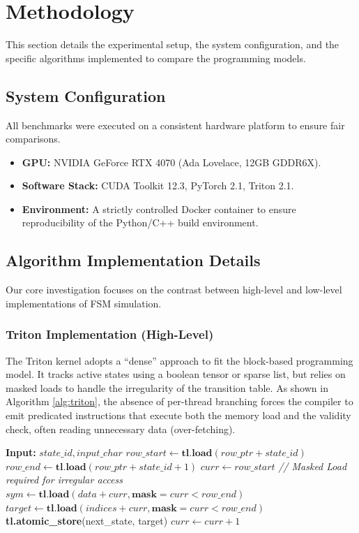 \section{Methodology}\label{sec:method}

This section details the experimental setup, the system configuration, and the specific algorithms implemented to compare the programming models.

\subsection{System Configuration}
All benchmarks were executed on a consistent hardware platform to ensure fair comparisons.
\begin{itemize}
    \item \textbf{GPU:} NVIDIA GeForce RTX 4070 (Ada Lovelace, 12GB GDDR6X).
    \item \textbf{Software Stack:} CUDA Toolkit 12.3, PyTorch 2.1, Triton 2.1.
    \item \textbf{Environment:} A strictly controlled Docker container to ensure reproducibility of the Python/C++ build environment.
\end{itemize}

\subsection{Algorithm Implementation Details}

Our core investigation focuses on the contrast between high-level and low-level implementations of FSM simulation.

\subsubsection{Triton Implementation (High-Level)}
The Triton kernel adopts a ``dense'' approach to fit the block-based programming model. It tracks active states using a boolean tensor or sparse list, but relies on masked loads to handle the irregularity of the transition table.
As shown in Algorithm \ref{alg:triton}, the absence of per-thread branching forces the compiler to emit predicated instructions that execute both the memory load and the validity check, often reading unnecessary data (over-fetching).

\begin{algorithm}[h]
\caption{Triton CSR Kernel Logic (Simplified)}
\label{alg:triton}
\begin{algorithmic}[1]
\STATE \textbf{Input:} $state\_id, input\_char$
\STATE $row\_start \leftarrow \textbf{tl.load}(row\_ptr + state\_id)$
\STATE $row\_end \leftarrow \textbf{tl.load}(row\_ptr + state\_id + 1)$
\STATE $curr \leftarrow row\_start$
    \STATE \textit{// Masked Load required for irregular access}
    \STATE $sym \leftarrow \textbf{tl.load}(data + curr, \textbf{mask}=curr < row\_end)$
    \STATE $target \leftarrow \textbf{tl.load}(indices + curr, \textbf{mask}=curr < row\_end)$
        \STATE \textbf{tl.atomic\_store}(next\_state, target)
    \ENDIF
    \STATE $curr \leftarrow curr + 1$
\ENDWHILE
\end{algorithmic}
\end{algorithm}

